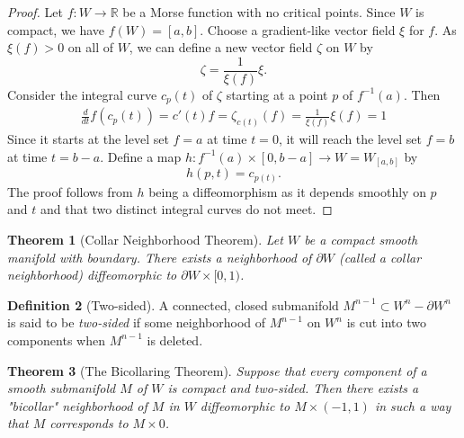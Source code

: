 \documentclass[reqno]{amsart}
\newtheorem{theorem}{Theorem}[section]
\theoremstyle{definition}
\newtheorem{definition}[theorem]{Definition}
\theoremstyle{remark}
\begin{document}
        \begin{proof}
            Let $f \colon W \to \mathbb{R}$ be a Morse function
            with no critical points. 
            Since $W$ is compact, we have
            $f(W) = \left[ a,b \right] $.
            Choose a gradient-like vector field
            $\xi$ for $f$. As $\xi (f) > 0$ on all
            of $W$, we can define a new
            vector field $\zeta$ on $W$ by
            \[
            \zeta = \frac{1}{\xi (f)} \xi.
            \] 
            Consider the integral curve
            $c_p(t)$ of $\zeta$ starting at a 
            point $p$ of $f^{-1}(a)$. Then
            \begin{align*}
                \frac{d}{dt} f\left( c_p(t) \right) 
                = c'(t) f
                = \zeta_{c(t)} (f)
                = \frac{1}{\xi (f)} \xi (f)
                = 1
            \end{align*}
        Since it starts at the level set
        $f = a$ at time $t = 0$, it will reach the
        level set $f = b$ at time
        $t = b-a$. Define a map
        $h \colon f^{-1}(a) \times \left[ 0, b-a \right] 
        \to W = W_{[a,b]}$ by
        \[
        h(p,t) = c_{p(t)}.
        \] 
        The proof follows from $h$ being a diffeomorphism
        as it depends smoothly on $p $ and $t$ and that
    two distinct integral curves do not meet.
        \end{proof}

        \begin{theorem}[Collar Neighborhood Theorem]
            Let $W$ be a compact smooth manifold with
            boundary. There exists a neighborhood of
            $\partial W$ (called a collar neighborhood)
            diffeomorphic to 
            $\partial W \times [0,1)$.
        \end{theorem}

        \begin{definition}[Two-sided]
            A connected, closed submanifold
            $M^{n-1} \subset 
            W^{n} - \partial W^{n}$ is said to be
            \textit{two-sided} if some neighborhood
            of $M^{n-1}$ on $W^{n}$ is cut
            into two components when $M^{n-1}$ is deleted.
        \end{definition}


        \begin{theorem}[The Bicollaring Theorem]
            Suppose that every component of
            a smooth submanifold $M$ of $W$ is
            compact and two-sided. Then there
            exists a "bicollar" neighborhood of
            $M$ in $W$ diffeomorphic to
            $M \times (-1,1)$ in such a way that
            $M$ corresponds to
            $M \times 0$.
        \end{theorem}
\end{document}
